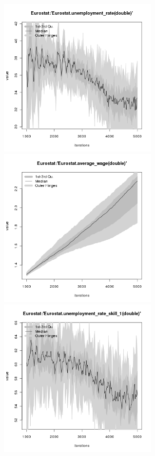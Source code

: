 \begin{figure}[H!]
\centering\leavevmode
\begin{minipage}{17cm}
\centering\leavevmode
\includegraphics[width=8cm]{./png/tax_0.10/Eurostat-unemployment_rate.png}
\includegraphics[width=8cm]{./png/tax_0.10/Eurostat-average_wage.png}\\
\includegraphics[width=8cm]{./png/tax_0.10/Eurostat-unemployment_rate_skill_1.png}

\end{minipage}
\end{figure}
